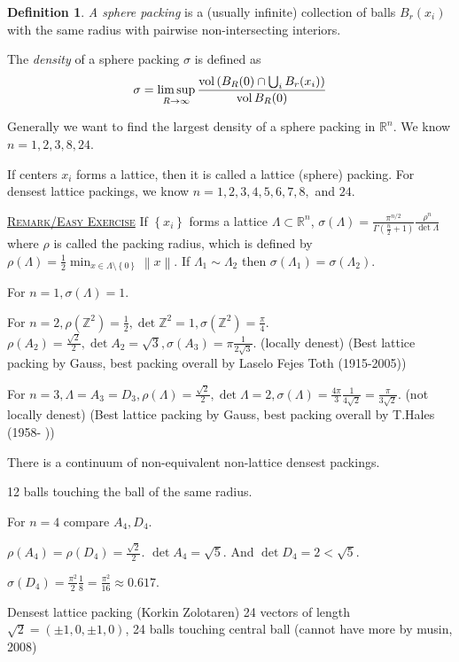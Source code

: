 \documentclass{report}
\newcommand{\R}{\mathbb{R}}
\newcommand{\Z}{\mathbb{Z}}
\newcommand{\norm}[1]{\left\| #1 \right\|}
\newcommand{\set}[1]{\left\{ #1 \right\}}
\newcommand{\fancyem}[1]{\underline{\textsc{#1}}}
\theoremstyle{definition}
\newtheorem{definition}{Definition}[section]
\theoremstyle{remark}
\numberwithin{equation}{section}
\begin{document}
\begin{definition}
    \emph{A sphere packing} is a (usually infinite) collection of balls $B_r(x_i)$ with the same radius with pairwise non-intersecting interiors.
    
    The \emph{density} of a sphere packing $\sigma$ is defined as \[
        \sigma = \limsup_{R\to\infty} \frac{\operatorname{vol}\left(B_R(0) \cap \bigcup_i B_r(x_i)\right)}{\operatorname{vol} B_R(0)}\]
\end{definition}

Generally we want to find the largest density of a sphere packing in $\R^n$. We know $n=1, 2, 3, 8, 24$.

If centers $x_i$ forms a lattice, then it is called a lattice (sphere) packing. For densest lattice packings, we know $n = 1, 2, 3, 4, 5, 6, 7, 8, $ and $24$.

\fancyem{Remark/Easy Exercise} If $\set{x_i}$ forms a lattice $\Lambda \subset \R^n$, $\sigma(\Lambda) = \frac{\pi^{n/2}}{\Gamma\left(\frac{n}{2}+1\right)}\frac{\rho^n}{\det \Lambda}$ where $\rho$ is called the packing radius, which is defined by $\rho(\Lambda) = \frac{1}{2}\min_{x \in \Lambda \setminus \set{0}} \norm{x}$. If $\Lambda_1 \sim \Lambda_2$ then $\sigma(\Lambda_1) = \sigma(\Lambda_2)$.

For $n=1, \sigma(\Lambda) = 1$.

For $n=2, \rho(\Z^2) = \frac{1}{2}, \det \Z^2 = 1, \sigma(\Z^2) = \frac{\pi}{4}$.
$\rho(A_2) = \frac{\sqrt{2}}{2}, \det A_2 = \sqrt{3}, \sigma(A_3) = \pi \frac{1}{2\sqrt{3}}$. (locally denest) (Best lattice packing by Gauss, best packing overall by Laselo Fejes Toth (1915-2005))

For $n = 3, \Lambda = A_3 = D_3, \rho(\Lambda) = \frac{\sqrt{2}}{2}, \det \Lambda = 2, \sigma(\Lambda) = \frac{4\pi}{3}\frac{1}{4\sqrt{2}} = \frac{\pi}{3\sqrt{2}}$. (not locally denest) (Best lattice packing by Gauss, best packing overall by T.Hales (1958- ))

There is a continuum of non-equivalent non-lattice densest packings.

12 balls touching the ball of the same radius.

For $n = 4$ compare $A_4, D_4$.

$\rho(A_4) = \rho(D_4) = \frac{\sqrt{2}}{2}$. $\det A_4 = \sqrt{5}$. And $\det D_4 = 2 < \sqrt{5}$.

$\sigma(D_4) = \frac{\pi^2}{2}\frac{1}{8} = \frac{\pi^2}{16} \approx 0.617$.

Densest lattice packing (Korkin Zolotaren)
24 vectors of length $\sqrt{2} = (\pm1,0,\pm1, 0)$, 24 balls touching central ball (cannot have more by musin, 2008)
\end{document}
